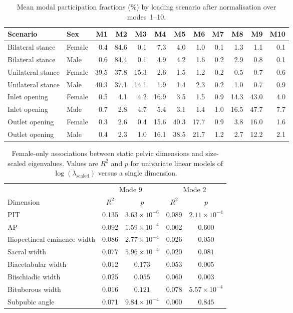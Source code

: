 \documentclass[openacc]{rsproca_new}
\begin{document}
\begin{table}[p]\centering
\caption{Mean modal participation fractions (\%) by loading scenario after normalisation over modes~1--10.}
\begin{tabular}{llrrrrrrrrrr}\toprule
Scenario & Sex & M1 & M2 & M3 & M4 & M5 & M6 & M7 & M8 & M9 & M10 \\\midrule
Bilateral stance & Female & 0.4 & 84.6 & 0.1 & 7.3 & 4.0 & 1.0 & 0.1 & 1.3 & 1.1 & 0.1 \\
Bilateral stance & Male & 0.6 & 84.4 & 0.1 & 4.9 & 4.2 & 1.6 & 0.2 & 2.9 & 0.8 & 0.1 \\
Unilateral stance & Female & 39.5 & 37.8 & 15.3 & 2.6 & 1.5 & 1.2 & 0.2 & 0.5 & 0.7 & 0.6 \\
Unilateral stance & Male & 40.3 & 37.1 & 14.1 & 1.9 & 1.4 & 2.3 & 0.2 & 1.0 & 0.7 & 0.9 \\
Inlet opening & Female & 0.5 & 4.1 & 4.2 & 16.9 & 3.5 & 1.5 & 0.9 & 14.3 & 43.0 & 4.0 \\
Inlet opening & Male & 0.7 & 2.8 & 4.7 & 5.4 & 3.1 & 1.4 & 1.0 & 16.5 & 47.7 & 7.7 \\
Outlet opening & Female & 0.3 & 2.6 & 0.4 & 15.6 & 40.3 & 17.7 & 0.9 & 3.8 & 16.0 & 1.6 \\
Outlet opening & Male & 0.4 & 2.3 & 1.0 & 16.1 & 38.5 & 21.7 & 1.2 & 2.7 & 12.2 & 2.1 \\
\bottomrule\end{tabular}\end{table}
\begin{table}[p]\centering
\caption{Female-only associations between static pelvic dimensions and size-scaled eigenvalues. Values are $R^2$ and $p$ for univariate linear models of $\log(\lambda_{\mathrm{scaled}})$ versus a single dimension.}
\begin{tabular}{lcccc}\toprule
& \multicolumn{2}{c}{Mode 9} & \multicolumn{2}{c}{Mode 2} \\\cmidrule(lr){2-3}\cmidrule(lr){4-5}
Dimension & $R^2$ & $p$ & $R^2$ & $p$ \\\midrule
PIT & 0.135 & $3.63 \times 10^{-6}$ & 0.089 & $2.11 \times 10^{-4}$ \\
AP & 0.092 & $1.59 \times 10^{-4}$ & 0.002 & $0.600$ \\
Iliopectineal eminence width & 0.086 & $2.77 \times 10^{-4}$ & 0.026 & $0.050$ \\
Sacral width & 0.077 & $5.96 \times 10^{-4}$ & 0.020 & $0.081$ \\
Biacetabular width & 0.012 & $0.173$ & 0.053 & $0.005$ \\
Biischiadic width & 0.025 & $0.055$ & 0.060 & $0.003$ \\
Bituberous width & 0.016 & $0.121$ & 0.078 & $5.57 \times 10^{-4}$ \\
Subpubic angle & 0.071 & $9.84 \times 10^{-4}$ & 0.000 & $0.845$ \\
\bottomrule\end{tabular}\end{table}
\end{document}
